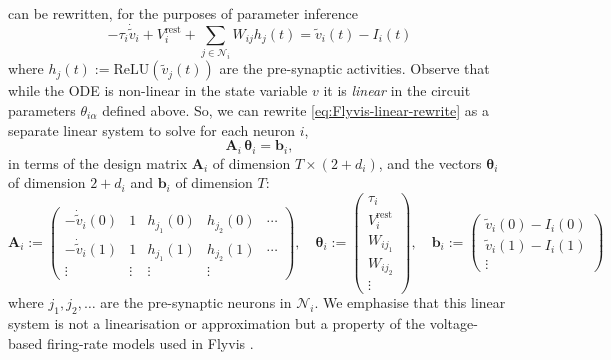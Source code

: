 \documentclass{article}
\def\vrest{V^{\mathrm{rest}}}
\def\relu{\mathrm{ReLU}}
\begin{document}
 can be rewritten, for the purposes of parameter inference
\begin{equation}
    -\tau_i \dot{\tilde{v}}_i + \vrest_i + \sum_{j \in \mathcal{N}_i} W_{ij}h_j(t) = \tilde{v}_i(t) - I_i(t)
    \label{eq:Flyvis-linear-rewrite}
\end{equation}
where $h_j(t) := \relu(\tilde{v}_j(t))$ are the pre-synaptic activities.
Observe that while the ODE is non-linear in the state variable $v$ it is
\emph{linear} in the circuit parameters $\theta_{i\alpha}$ defined above. So, 
we can rewrite \cref{eq:Flyvis-linear-rewrite} as a separate
linear system to solve for each neuron $i$,
\begin{equation}
    \mathbf{A}_i \, \boldsymbol{\theta}_i = \mathbf{b}_i,
    \label{eq:parameter-linear-system}
\end{equation}
in terms of the design matrix $\mathbf{A}_i$ of dimension $T \times (2 + d_i)$,
and the vectors $\boldsymbol{\theta}_i$ of dimension $2 + d_i$ and
$\mathbf{b}_i$ of dimension $T$:
\begin{equation}
    \mathbf{A}_i := \begin{pmatrix}
        -\dot{\tilde{v}}_i(0) & 1 & h_{j_1}(0) & h_{j_2}(0) & \cdots  \\
        -\dot{\tilde{v}}_i(1) & 1 & h_{j_1}(1) & h_{j_2}(1) & \cdots  \\
        \vdots & \vdots & \vdots & \vdots &
    \end{pmatrix},\quad
    \boldsymbol{\theta}_i := \begin{pmatrix}
        \tau_i \\ \vrest_i \\ W_{ij_1} \\ W_{ij_2} \\ \vdots
    \end{pmatrix},\quad
    \mathbf{b}_i := \begin{pmatrix}
        \tilde{v}_i(0) - I_i(0) \\
        \tilde{v}_i(1) - I_i(1) \\
        \vdots
    \end{pmatrix}
    \label{eq:explicit-linear-system}
\end{equation}
where $j_1, j_2, \ldots$ are the pre-synaptic neurons in $\mathcal{N}_i$.
We emphasise that this linear system is not a linearisation or approximation
but a property of the voltage-based firing-rate models used in Flyvis
\citep{lappalainen_connectome-constrained_2024}.
\end{document}
